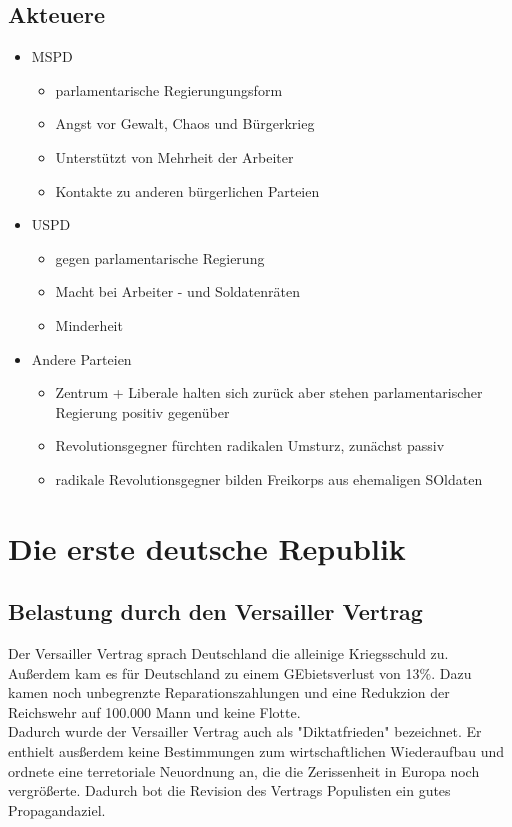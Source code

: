 \documentclass{article}
\begin{document}
\subsection*{Akteuere}
\begin{itemize}
    \item MSPD \begin{itemize}
              \item parlamentarische Regierungungsform
              \item Angst vor Gewalt, Chaos und Bürgerkrieg
              \item Unterstützt von Mehrheit der Arbeiter
              \item Kontakte zu anderen bürgerlichen Parteien
          \end{itemize}
    \item USPD \begin{itemize}
              \item gegen parlamentarische Regierung
              \item Macht bei Arbeiter - und Soldatenräten
              \item Minderheit
          \end{itemize}
    \item Andere Parteien \begin{itemize}
              \item Zentrum + Liberale halten sich zurück aber stehen parlamentarischer Regierung positiv gegenüber
              \item Revolutionsgegner fürchten radikalen Umsturz, zunächst passiv
              \item radikale Revolutionsgegner bilden Freikorps aus ehemaligen SOldaten
          \end{itemize}
\end{itemize}
\section*{Die erste deutsche Republik}
\subsection*{Belastung durch den Versailler Vertrag}
Der Versailler Vertrag sprach Deutschland die alleinige Kriegsschuld zu. Außerdem kam es
für Deutschland zu einem GEbietsverlust von 13\%. Dazu kamen noch unbegrenzte
Reparationszahlungen und eine Redukzion der Reichswehr auf 100.000 Mann und keine Flotte.
\\Dadurch wurde der Versailler Vertrag auch als "Diktatfrieden" bezeichnet.
Er enthielt ausßerdem keine Bestimmungen zum wirtschaftlichen Wiederaufbau
und ordnete eine terretoriale Neuordnung an, die die Zerissenheit in Europa noch vergrößerte.
Dadurch bot die Revision des Vertrags Populisten ein gutes Propagandaziel.
\end{document}
